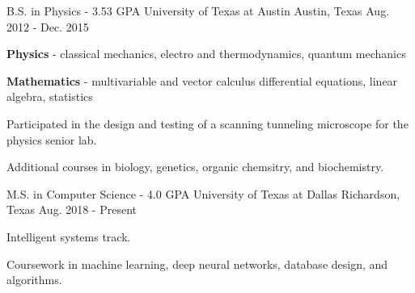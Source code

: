 

\begin{cventries}

  \cventry
    {B.S. in Physics - 3.53 GPA} %
    {University of Texas at Austin} %
    {Austin, Texas} %
    {Aug. 2012 - Dec. 2015} %
    {
      \begin{cvitems} %
        \item {
			\textbf{Physics} - classical mechanics, electro and
			thermodynamics, quantum mechanics
		}
        \item {
			\textbf{Mathematics} - multivariable and vector
			calculus
			differential equations, linear algebra,
			statistics
		}
        \item {
			Participated in the design and testing of a scanning
			tunneling microscope for the physics senior lab.
		}
        \item {
			Additional courses in biology, genetics, organic
			chemsitry, and biochemistry.
		}
      \end{cvitems}
    }

  \cventry
    {M.S. in Computer Science - 4.0 GPA} %
    {University of Texas at Dallas} %
    {Richardson, Texas} %
    {Aug. 2018 - Present} %
    {
      \begin{cvitems} %
        \item {Intelligent systems track.}
        \item {
			Coursework in machine learning, deep neural networks,
			database design, and algorithms.
		}
      \end{cvitems}
    }

\end{cventries}
